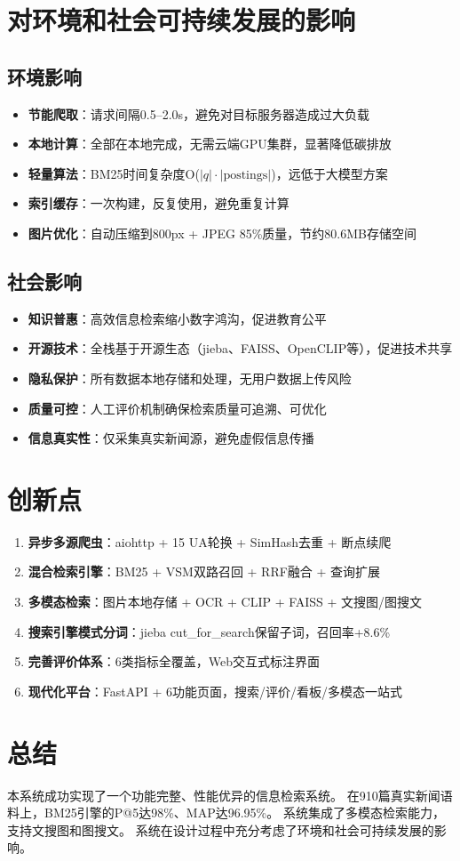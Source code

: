 \documentclass[12pt,a4paper]{ctexart}
\begin{document}
\section{对环境和社会可持续发展的影响}

\subsection{环境影响}

\begin{itemize}
    \item \textbf{节能爬取}：请求间隔0.5--2.0s，避免对目标服务器造成过大负载
    \item \textbf{本地计算}：全部在本地完成，无需云端GPU集群，显著降低碳排放
    \item \textbf{轻量算法}：BM25时间复杂度O($|q| \cdot |\text{postings}|$)，远低于大模型方案
    \item \textbf{索引缓存}：一次构建，反复使用，避免重复计算
    \item \textbf{图片优化}：自动压缩到800px + JPEG 85\%质量，节约80.6MB存储空间
\end{itemize}

\subsection{社会影响}

\begin{itemize}
    \item \textbf{知识普惠}：高效信息检索缩小数字鸿沟，促进教育公平
    \item \textbf{开源技术}：全栈基于开源生态（jieba、FAISS、OpenCLIP等），促进技术共享
    \item \textbf{隐私保护}：所有数据本地存储和处理，无用户数据上传风险
    \item \textbf{质量可控}：人工评价机制确保检索质量可追溯、可优化
    \item \textbf{信息真实性}：仅采集真实新闻源，避免虚假信息传播
\end{itemize}

\section{创新点}

\begin{enumerate}
    \item \textbf{异步多源爬虫}：aiohttp + 15 UA轮换 + SimHash去重 + 断点续爬
    \item \textbf{混合检索引擎}：BM25 + VSM双路召回 + RRF融合 + 查询扩展
    \item \textbf{多模态检索}：图片本地存储 + OCR + CLIP + FAISS + 文搜图/图搜文
    \item \textbf{搜索引擎模式分词}：jieba cut\_for\_search保留子词，召回率+8.6\%
    \item \textbf{完善评价体系}：6类指标全覆盖，Web交互式标注界面
    \item \textbf{现代化平台}：FastAPI + 6功能页面，搜索/评价/看板/多模态一站式
\end{enumerate}

\section{总结}

本系统成功实现了一个功能完整、性能优异的信息检索系统。
在910篇真实新闻语料上，BM25引擎的P@5达98\%、MAP达96.95\%。
系统集成了多模态检索能力，支持文搜图和图搜文。
系统在设计过程中充分考虑了环境和社会可持续发展的影响。
\end{document}
